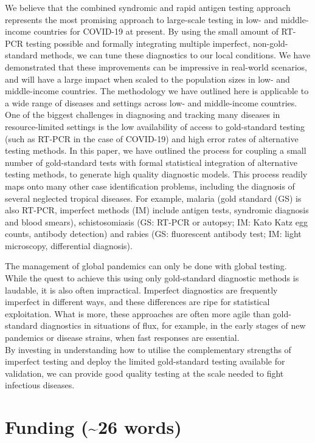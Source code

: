\documentclass[]{elsarticle} %
\begin{document}
We believe that the combined syndromic and rapid antigen testing approach represents the most promising approach to large-scale testing in low- and middle- income countries for COVID-19 at present.
By using the small amount of RT-PCR testing possible and formally integrating multiple imperfect, non-gold-standard methods, we can tune these diagnostics to our local conditions.
We have demonstrated that these improvements can be impressive in real-world scenarios, and will have a large impact when scaled to the population sizes in low- and middle-income countries.
The methodology we have outlined here is applicable to a wide range of diseases and settings across low- and middle-income countries.
One of the biggest challenges in diagnosing and tracking many diseases in resource-limited settings is the low availability of access to gold-standard testing (such as RT-PCR in the case of COVID-19) and high error rates of alternative testing methods.
In this paper, we have outlined the process for coupling a small number of gold-standard tests with formal statistical integration of alternative testing methods, to generate high quality diagnostic models.
This process readily maps onto many other case identification problems, including the diagnosis of several neglected tropical diseases. For example, malaria (gold standard (GS) is also RT-PCR, imperfect methods (IM) include antigen tests, syndromic diagnosis and blood smears), schistosomiasis (GS: RT-PCR or autopsy; IM: Kato Katz egg counts, antibody detection) and rabies (GS: fluorescent antibody test; IM: light microscopy, differential diagnosis).

The management of global pandemics can only be done with global testing.
While the quest to achieve this using only gold-standard diagnostic methods is laudable, it is also often impractical.
Imperfect diagnostics are frequently imperfect in different ways, and these differences are ripe for statistical exploitation.
What is more, these approaches are often more agile than gold-standard diagnostics in situations of flux, for example, in the early stages of new pandemics or disease strains, when fast responses are essential.\\
By investing in understanding how to utilise the complementary strengths of imperfect testing and deploy the limited gold-standard testing available for validation, we can provide good quality testing at the scale needed to fight infectious diseases.

\hypertarget{funding-26-words}{%
\section{Funding (\textasciitilde26 words)}\label{funding-26-words}}
\end{document}
